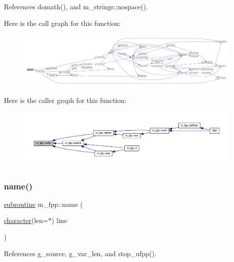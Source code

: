 References domath(), and m\+\_\+strings\+::nospace().

Here is the call graph for this function\+:
\nopagebreak
\begin{figure}[H]
\begin{center}
\leavevmode
\includegraphics[width=350pt]{namespacem__fpp_a7fe1c908c17895ebaa5afc2dc4cd1f1f_cgraph}
\end{center}
\end{figure}
Here is the caller graph for this function\+:
\nopagebreak
\begin{figure}[H]
\begin{center}
\leavevmode
\includegraphics[width=350pt]{namespacem__fpp_a7fe1c908c17895ebaa5afc2dc4cd1f1f_icgraph}
\end{center}
\end{figure}
\mbox{\label{namespacem__fpp_ac32c830615f875efaf8678759daa7f39}} 
\subsubsection{\texorpdfstring{name()}{name()}}
{\footnotesize\ttfamily \hyperlink{M__stopwatch_83_8txt_acfbcff50169d691ff02d4a123ed70482}{subroutine} m\+\_\+fpp\+::name (\begin{DoxyParamCaption}\item[{\hyperlink{option__stopwatch_83_8txt_abd4b21fbbd175834027b5224bfe97e66}{character}(len=$\ast$)}]{line }\end{DoxyParamCaption})}



References g\+\_\+source, g\+\_\+var\+\_\+len, and stop\+\_\+ufpp().

